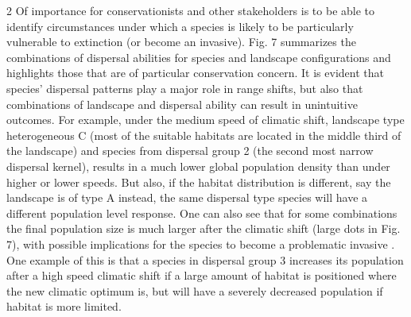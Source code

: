 \documentclass[12pt,pdftex]{article}
\begin{document}
\begin{spacing}{2}
Of importance for conservationists and other stakeholders is to be able to identify circumstances under which a species is likely to be particularly vulnerable to extinction (or become an invasive).  Fig. 7 summarizes the combinations of dispersal abilities for species and landscape configurations and highlights those that are of particular conservation concern. It is evident that species' dispersal patterns play a major role in range shifts, but also that combinations of landscape and dispersal ability can result in unintuitive outcomes. For example, under the medium speed of climatic shift, landscape type heterogeneous C (most of the suitable habitats are located in the middle third of the landscape) and species from dispersal group 2 (the second most narrow dispersal kernel), results in a much lower global population density than under higher or lower speeds. But also, if the habitat distribution is different, say the landscape is of type A instead, the same dispersal type species will have a different population level response. One can also see that for some combinations the final population size is much larger after the climatic shift (large dots in Fig. 7), with possible implications for the species to become a problematic invasive \citep[for a summary of potential mechanisms, see ][]{Hellmann2008}. One example of this is that a species in dispersal group 3 increases its population after a high speed climatic shift if a large amount of habitat is positioned where the new climatic optimum is, but will have a severely decreased population if habitat is more limited.    



\end{spacing}
\end{document}
